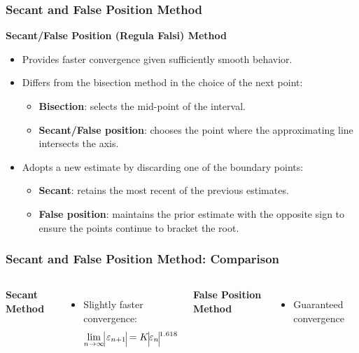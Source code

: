   \begin{frame}[fragile]
    \frametitle{Secant and False Position Method}
  
    \textbf{Secant/False Position (Regula Falsi) Method}
      \begin{itemize}
        \item Provides faster convergence given sufficiently smooth behavior.
        \item Differs from the bisection method in the choice of the next point:
        \begin{itemize}
          \item \textbf{Bisection}: selects the mid-point of the interval.
          \item \textbf{Secant/False position}: chooses the point where the approximating line intersects the axis.
        \end{itemize}
        \item Adopts a new estimate by discarding one of the boundary points:
        \begin{itemize}
          \item \textbf{Secant}: retains the most recent of the previous estimates.
          \item \textbf{False position}: maintains the prior estimate with the opposite sign to ensure the points continue to bracket the root.
        \end{itemize}
      \end{itemize}
  \end{frame}
  
  \begin{frame}[fragile]
    \frametitle{Secant and False Position Method: Comparison}

    \begin{columns}
        \textbf{Secant Method}
        \vspace{0.1cm}
        \newline 
        
        
      
        \begin{itemize}
          \item Slightly faster convergence:
          \[
          \lim_{n \to \infty} \vline\varepsilon_{n+1}\vline = K\vline\varepsilon_n\vline^{1.618}
          \]
        \end{itemize}
  
        \textbf{False Position Method}
        \vspace{0.3cm}
        \newline 
          
        \begin{itemize}
          \item Guaranteed convergence
        \end{itemize}
    \end{columns}
  \end{frame}

